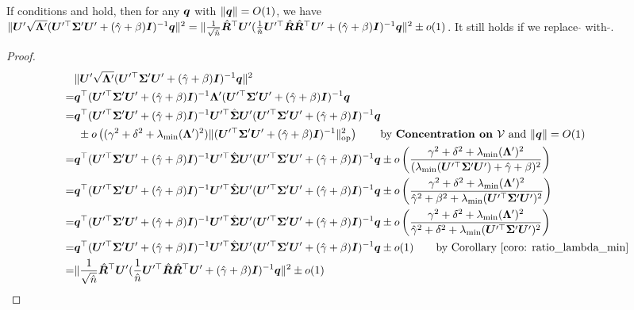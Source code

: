 \begin{corollary}\label{coro: sqrt_lambda_intermediate}
If conditions \bounded{} and \conc{} hold, then for any ${\bm{q}}$ with $\|{\bm{q}}\|=O(1)$, we have $\| {\bm{U}}' \sqrt{{\bm{\Lambda}}'} ({\bm{U}}'^\top{\bm{\Sigma}}'{\bm{U}}'+(\hat{\gamma}+\beta){\bm{I}} )^{-1} {\bm{q}}  \|^2 = \| \frac{1}{\sqrt{\hat{n}}}\hat{{\bm{R}}}^\top {\bm{U}}' ( \frac{1}{\hat{n}}{\bm{U}}'^\top\hat{{\bm{R}}}\hat{{\bm{R}}}^\top{\bm{U}}' + (\hat{\gamma}+\beta){\bm{I}} )^{-1}{\bm{q}}\|^2 \pm o(1)  $. It still holds if we replace $\hat{}$ with $\tilde{}$.
\end{corollary}
\begin{proof}
\begin{align}
    \nonumber
    &\| {\bm{U}}' \sqrt{{\bm{\Lambda}}'} ({\bm{U}}'^\top{\bm{\Sigma}}'{\bm{U}}'+(\hat{\gamma}+\beta){\bm{I}} )^{-1} {\bm{q}}  \|^2 \\
    \nonumber
    =& {\bm{q}}^\top ({\bm{U}}'^\top{\bm{\Sigma}}'{\bm{U}}'+(\hat{\gamma}+\beta){\bm{I}} )^{-1} {\bm{\Lambda}}'({\bm{U}}'^\top{\bm{\Sigma}}'{\bm{U}}'+(\hat{\gamma}+\beta){\bm{I}} )^{-1} {\bm{q}} \\
    \nonumber
    = & {\bm{q}}^\top ({\bm{U}}'^\top{\bm{\Sigma}}'{\bm{U}}'+(\hat{\gamma}+\beta){\bm{I}} )^{-1} {\bm{U}}'^\top\hat{{\bm{\Sigma}}}{\bm{U}}' ({\bm{U}}'^\top{\bm{\Sigma}}'{\bm{U}}'+(\hat{\gamma}+\beta){\bm{I}} )^{-1} {\bm{q}} \\
    \nonumber
     & ~\pm   o\left( (\gamma^2+\delta^2+\lambda_{\min}({\bm{\Lambda}}')^2) \lVert ({\bm{U}}'^\top{\bm{\Sigma}}'{\bm{U}}'+(\hat{\gamma}+\beta){\bm{I}} )^{-1} \rVert_{\mathrm{op}}^2  \right) \quad\quad\text{by \textbf{Concentration on ${\mathcal{V}}$}{} and $\|{\bm{q}}\|=O(1)$} \\
     \nonumber
     = & {\bm{q}}^\top ({\bm{U}}'^\top{\bm{\Sigma}}'{\bm{U}}'+(\hat{\gamma}+\beta){\bm{I}} )^{-1} {\bm{U}}'^\top\hat{{\bm{\Sigma}}}{\bm{U}}' ({\bm{U}}'^\top{\bm{\Sigma}}'{\bm{U}}'+(\hat{\gamma}+\beta){\bm{I}} )^{-1} {\bm{q}}  \pm o\left( \frac{\gamma^2+\delta^2+\lambda_{\min}({\bm{\Lambda}}')^2}{(\lambda_{\min}({\bm{U}}'^\top{\bm{\Sigma}}'{\bm{U}}') +\hat{\gamma}+\beta )^2 } \right)\\
     \nonumber
     = & {\bm{q}}^\top ({\bm{U}}'^\top{\bm{\Sigma}}'{\bm{U}}'+(\hat{\gamma}+\beta){\bm{I}} )^{-1} {\bm{U}}'^\top\hat{{\bm{\Sigma}}}{\bm{U}}' ({\bm{U}}'^\top{\bm{\Sigma}}'{\bm{U}}'+(\hat{\gamma}+\beta){\bm{I}} )^{-1} {\bm{q}}  \pm o\left( \frac{\gamma^2+\delta^2+\lambda_{\min}({\bm{\Lambda}}')^2}{ \hat{\gamma}^2+\beta^2+ \lambda_{\min}({\bm{U}}'^\top{\bm{\Sigma}}'{\bm{U}}')^2 } \right)\\
     \nonumber
     = & {\bm{q}}^\top ({\bm{U}}'^\top{\bm{\Sigma}}'{\bm{U}}'+(\hat{\gamma}+\beta){\bm{I}} )^{-1} {\bm{U}}'^\top\hat{{\bm{\Sigma}}}{\bm{U}}' ({\bm{U}}'^\top{\bm{\Sigma}}'{\bm{U}}'+(\hat{\gamma}+\beta){\bm{I}} )^{-1} {\bm{q}}  \pm o\left( \frac{\gamma^2+\delta^2+\lambda_{\min}({\bm{\Lambda}}')^2}{ \hat{\gamma}^2+\delta^2+ \lambda_{\min}({\bm{U}}'^\top{\bm{\Sigma}}'{\bm{U}}')^2 } \right)\\
     \nonumber
     = & {\bm{q}}^\top ({\bm{U}}'^\top{\bm{\Sigma}}'{\bm{U}}'+(\hat{\gamma}+\beta){\bm{I}} )^{-1} {\bm{U}}'^\top\hat{{\bm{\Sigma}}}{\bm{U}}' ({\bm{U}}'^\top{\bm{\Sigma}}'{\bm{U}}'+(\hat{\gamma}+\beta){\bm{I}} )^{-1} {\bm{q}}  \pm o(1) \quad\quad\text{by Corollary \ref{coro: ratio_lambda_min}} \\
     \nonumber
     = & \| \frac{1}{\sqrt{\hat{n}}}\hat{{\bm{R}}}^\top {\bm{U}}' ( \frac{1}{\hat{n}}{\bm{U}}'^\top\hat{{\bm{R}}}\hat{{\bm{R}}}^\top{\bm{U}}' + (\hat{\gamma}+\beta){\bm{I}} )^{-1}{\bm{q}}  \|^2 \pm o(1)
\end{align}
\end{proof}
